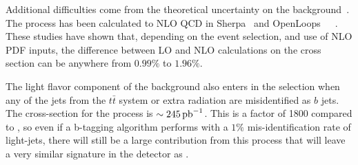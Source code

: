 \par Additional difficulties come from the theoretical uncertainty on
the \ttbb background~\cite{th:HiggsXS_2013}.  The process has been
calculated to NLO QCD in Sherpa~\cite{tthXS_sherpa_Gleisberg} and
OpenLoops~\cite{ttbbXS_openloops_Cascioli}~\cite{ttbbXS_openloops_help1_Krauss}~\cite{ttbbXS_openloops_help2_Gleisberg}.
These studies have shown that, depending on the event selection, and use of NLO PDF
inputs, the difference between LO and NLO calculations on the cross
section can be anywhere from $0.99\%$ to $1.96\%$.  

\par The light flavor component of the \ttjets background also enters
in the selection when any of the jets from the $t\bar{t}$ system or
extra radiation are misidentified as $b$ jets.  The cross-section for
the \ttjets process is $\sim245\mbox{\ensuremath{\,\text{pb}^\text{$-$1}}}$.  This is a factor of 1800
compared to \ttH, so
even if a b-tagging algorithm performs with a $1\%$ mis-identification
rate of light-jets, there will still be a large contribution from this
process that will leave a very similar signature in the detector as
\ttH. 

